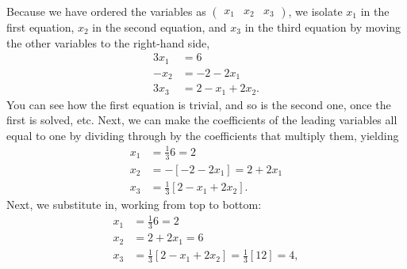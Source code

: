 Because we have ordered the variables as $\begin{pmatrix} x_1 & x_2 &x_3\end{pmatrix}$, we isolate $x_1$ in the first equation, $x_2$ in the second equation, and $x_3$ in the third equation by moving the other variables to the right-hand side,
\begin{equation}
    \begin{aligned}
3 x_1 &= 6 \\
 -x_2 &= -2 -2 x_1 \\
  3 x_3  &= 2 -x_1 + 2 x_2 .
    \end{aligned}
\end{equation}
You can see how the first equation is trivial, and so is the second one, once the first is solved, etc. Next, we can make the coefficients of the leading variables  all equal to one by dividing through by the coefficients that multiply them, yielding
\begin{equation}
    \begin{aligned}
 x_1 &=\frac{1}{3} 6 = 2\\
 x_2 &= -\left[ -2 -2 x_1\right] = 2 + 2 x_1\\
  x_3  &=\frac{1}{3}\left[ 2 -x_1 + 2 x_2\right].
    \end{aligned}
\end{equation}
Next, we substitute in, working from top to bottom:
\begin{equation}
    \begin{aligned}
     x_1 &=\frac{1}{3} 6 = 2\\
 x_2 &=  2 + 2 x_1 = 6\\
     x_3  &=\frac{1}{3}\left[ 2 -x_1 + 2 x_2 \right]=\frac{1}{3}\left[12 \right] =  4,
    \end{aligned}
\end{equation}

